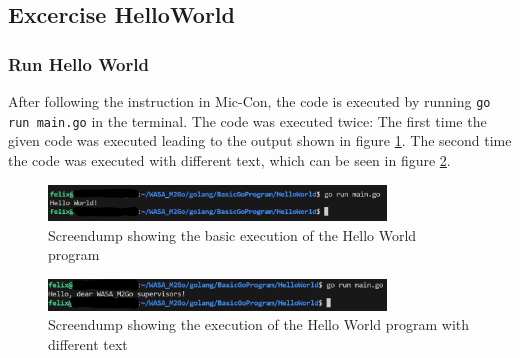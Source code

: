 \subsection{Excercise HelloWorld}
\label{sec:excercise_hello_world}

\subsubsection*{Run Hello World}
After following the instruction in Mic-Con, the code is executed by running \texttt{go run main.go} in the terminal.
The code was executed twice: The first time the given code was executed leading to the output shown in figure \ref{fig:screendump_helloWorld_basicExecution}.
The second time the code was executed with different text, which can be seen in figure \ref{fig:screendump_helloWorld_differentText}.

\begin{figure} [h]
    \centering
    \includegraphics[width=0.8\textwidth]{figures/goLang/helloWorld/golang_helloWorld_basicExecution.png}
    \caption{Screendump showing the basic execution of the Hello World program}
    \label{fig:screendump_helloWorld_basicExecution}
\end{figure}

\begin{figure}[h]
    \centering
    \includegraphics[width=0.8\textwidth]{figures/goLang/helloWorld/golang_helloWorld_ExecutionDifferentText.png}
    \caption{Screendump showing the execution of the Hello World program with different text}
    \label{fig:screendump_helloWorld_differentText}
\end{figure}

